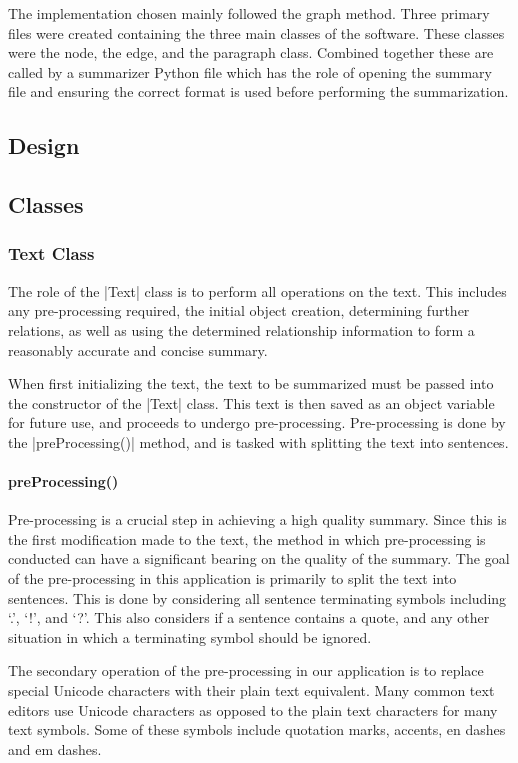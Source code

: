 
The implementation chosen mainly followed the graph method. Three primary files were created containing the three main classes of the software. These classes were the node, the edge, and the paragraph class. Combined together these are called by a summarizer Python file which has the role of opening the summary file and ensuring the correct format is used before performing the summarization.

\subsection{Design}



\subsection{Classes}
	\subsubsection{Text Class}
	The role of the |Text| class is to perform all operations on the text. This includes any pre-processing required, the initial object creation, determining further relations, as well as using the determined relationship information to form a reasonably accurate and concise summary.
	
	When first initializing the text, the text to be summarized must be passed into the constructor of the |Text| class. This text is then saved as an object variable for future use, and proceeds to undergo pre-processing. Pre-processing is done by the |preProcessing()| method, and is tasked with splitting the text into sentences.
	
	\paragraph{preProcessing()}
		Pre-processing is a crucial step in achieving a high quality summary. Since this is the first modification made to the text, the method in which pre-processing is conducted can have a significant bearing on the quality of the summary. The goal of the pre-processing in this application is primarily to split the text into sentences. This is done by considering all sentence terminating symbols including `.', `!', and `?'. This also considers if a sentence contains a quote, and any other situation in which a terminating symbol should be ignored.
		
		The secondary operation of the pre-processing in our application is to replace special Unicode characters with their plain text equivalent. Many common text editors use Unicode characters as opposed to the plain text characters for many text symbols. Some of these symbols include quotation marks, accents, en dashes and em dashes.
		

